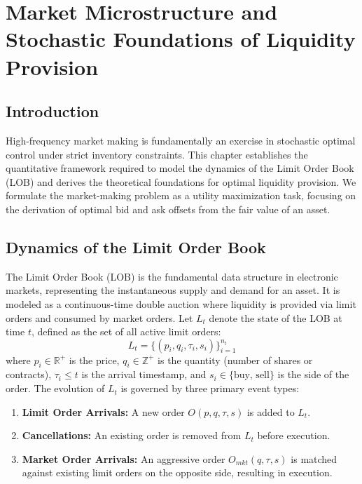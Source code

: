 \chapter{Market Microstructure and Stochastic Foundations of Liquidity Provision}
\label{ch:microstructure}

\section{Introduction}
High-frequency market making is fundamentally an exercise in stochastic optimal control under strict inventory constraints. This chapter establishes the quantitative framework required to model the dynamics of the Limit Order Book (LOB) and derives the theoretical foundations for optimal liquidity provision. We formulate the market-making problem as a utility maximization task, focusing on the derivation of optimal bid and ask offsets from the fair value of an asset.

\section{Dynamics of the Limit Order Book}
The Limit Order Book (LOB) is the fundamental data structure in electronic markets, representing the instantaneous supply and demand for an asset. It is modeled as a continuous-time double auction where liquidity is provided via limit orders and consumed by market orders. Let $L_t$ denote the state of the LOB at time $t$, defined as the set of all active limit orders:
\begin{equation}
    L_t = \{ (p_i, q_i, \tau_i, s_i) \}_{i=1}^{n_t}
\end{equation}
where $p_i \in \mathbb{R}^+$ is the price, $q_i \in \mathbb{Z}^+$ is the quantity (number of shares or contracts), $\tau_i \leq t$ is the arrival timestamp, and $s_i \in \{ \text{buy, sell} \}$ is the side of the order. The evolution of $L_t$ is governed by three primary event types:
\begin{enumerate}
    \item \textbf{Limit Order Arrivals:} A new order $O(p, q, \tau, s)$ is added to $L_t$.
    \item \textbf{Cancellations:} An existing order is removed from $L_t$ before execution.
    \item \textbf{Market Order Arrivals:} An aggressive order $O_{mkt}(q, \tau, s)$ is matched against existing limit orders on the opposite side, resulting in execution.
\end{enumerate}

